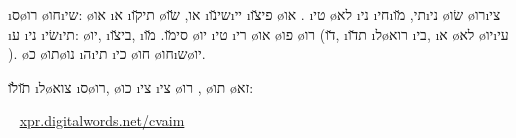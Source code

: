 




\i{ס}\o{רו}  \o{חו}\i{שי}:  \o{או}  \i{א} \i{תי}\u{קו} \o{או}, \u{שׂו}  \i{שי}\u{נו}\i{יי} \i{פי}\u{צו} \o{או} .  \i{טי} \o{לא} \i{ני} \i{חי}\i{תי},   \u{מו}\i{ני} \o{שׂו}   \o{רו}\i{צי} \i{ע}  \i{ני} \i{שׂי}\i{תי}: \o{יו}, \i{בי}\u{צו}, \i{סי}\u{מו}.  \u{מו}    \o{יו} \i{טי} \i{רי} \o{או} \o{פו} \o{רו} (\u{דו}, \i{ת}\u{דו} \i{ל}\o{רוא} \i{בי}, \i{א}  \o{לא} \o{יו}\i{עי} ).  \o{כ} \o{תו}\o{נו} \i{ה}\i{תי}   \i{כי}  \o{חו}  \o{חו}\i{ש}\o{יו}.

\u{תו}\u{לו} \i{ל}\o{צוא}  \i{ס}\o{רו}, \o{כו} \i{צי}  \i{צי} \o{רו} , \o{תו} \o{זא}:

{~\hfill
	\url{xpr.digitalwords.net/cvaim} 
	\hfill~
}
\vspace{1ex}

